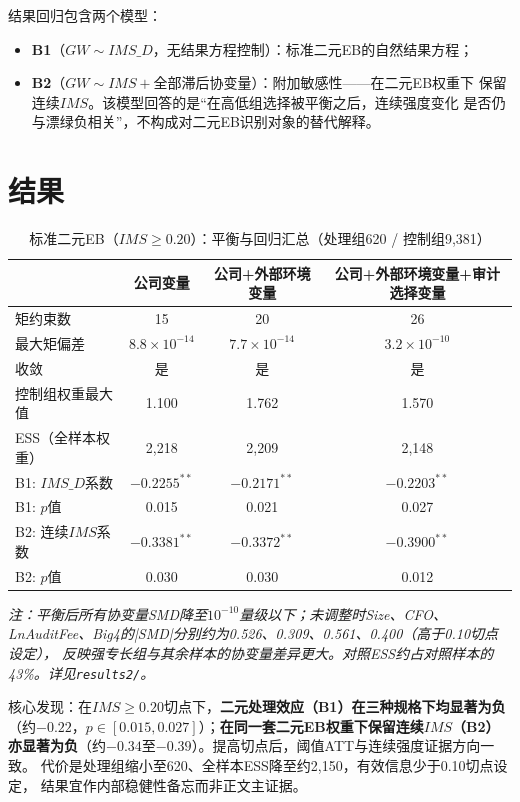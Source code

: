 \documentclass[11pt]{article}
\begin{document}
结果回归包含两个模型：
\begin{itemize}
  \item \textbf{B1}（\(GW \sim IMS\_D\)，无结果方程控制）：标准二元EB的自然结果方程；
  \item \textbf{B2}（\(GW \sim IMS + \text{全部滞后协变量}\)）：附加敏感性——在二元EB权重下
        保留连续\(IMS\)。该模型回答的是“在高低组选择被平衡之后，连续强度变化
        是否仍与漂绿负相关”，不构成对二元EB识别对象的替代解释。
\end{itemize}

\section{结果}

\begin{table}[htbp]
\centering
\caption{标准二元EB（\(IMS\ge0.20\)）：平衡与回归汇总（处理组620 / 控制组9,381）}
\begin{tabular}{lccc}
\toprule
 & 公司变量 & 公司+外部环境变量 & 公司+外部环境变量+审计选择变量 \\
\midrule
矩约束数 & 15 & 20 & 26 \\
最大矩偏差 & \(8.8\times10^{-14}\) & \(7.7\times10^{-14}\) & \(3.2\times10^{-10}\) \\
收敛 & 是 & 是 & 是 \\
控制组权重最大值 & 1.100 & 1.762 & 1.570 \\
ESS（全样本权重） & 2,218 & 2,209 & 2,148 \\
B1: \(IMS\_D\)系数 & \(-0.2255^{**}\) & \(-0.2171^{**}\) & \(-0.2203^{**}\) \\
B1: \(p\)值 & 0.015 & 0.021 & 0.027 \\
B2: 连续\(IMS\)系数 & \(-0.3381^{**}\) & \(-0.3372^{**}\) & \(-0.3900^{**}\) \\
B2: \(p\)值 & 0.030 & 0.030 & 0.012 \\
\bottomrule
\end{tabular}

\small
\textit{注：平衡后所有协变量SMD降至\(10^{-10}\)量级以下；未调整时Size、CFO、
LnAuditFee、Big4的|SMD|分别约为0.526、0.309、0.561、0.400（高于0.10切点设定），
反映强专长组与其余样本的协变量差异更大。对照ESS约占对照样本的43\%。详见\texttt{results2/}。}
\end{table}

核心发现：在\(IMS\ge0.20\)切点下，\textbf{二元处理效应（B1）在三种规格下均显著为负}
（约\(-0.22\)，\(p\in[0.015,0.027]\)）；\textbf{在同一套二元EB权重下保留连续\(IMS\)（B2）
亦显著为负}（约\(-0.34\)至\(-0.39\)）。提高切点后，阈值ATT与连续强度证据方向一致。
代价是处理组缩小至620、全样本ESS降至约2,150，有效信息少于0.10切点设定，
结果宜作内部稳健性备忘而非正文主证据。
\end{document}
